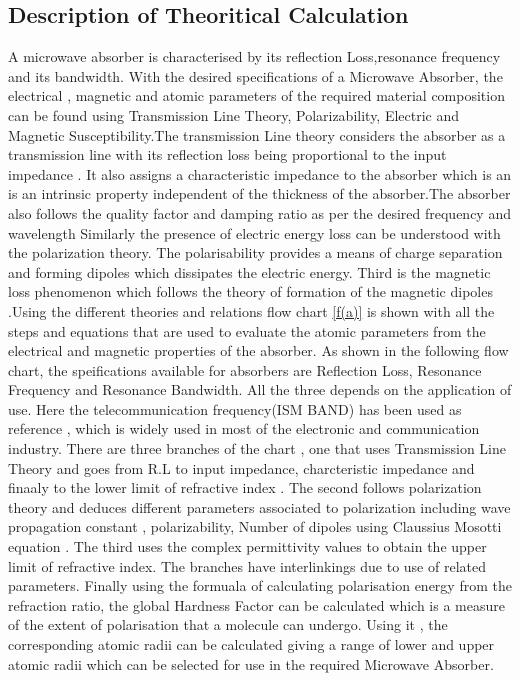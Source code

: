 \documentclass[journal]{IEEEtran}
\begin{document}
\subsection{Description of Theoritical Calculation}
A microwave absorber is characterised by its reflection Loss,resonance frequency and its bandwidth.  With the desired specifications of a Microwave Absorber, the electrical , magnetic and atomic parameters of the required  material composition can be found  using Transmission Line Theory, Polarizability, Electric and Magnetic Susceptibility\cite{YingL,liu2018systemized}.The transmission Line theory considers the absorber as a transmission line with its reflection loss being proportional to the input impedance . It also assigns a characteristic impedance to the absorber which is an  is an intrinsic property independent of the thickness of the absorber.The absorber also follows the quality factor and damping ratio as per the desired frequency and wavelength\cite{Cory,Tooley} Similarly the presence of electric energy loss can be understood with the polarization theory. The polarisability provides a means of charge separation and forming dipoles which dissipates the electric energy\cite{AlphaP,Inter}. Third is the magnetic loss phenomenon which follows the theory of formation of the magnetic dipoles \cite{}  .Using the different theories and relations flow chart \ref{f(a)} is shown with all the steps and equations that are used to evaluate the atomic parameters from the electrical and magnetic properties of the absorber. As shown in the following flow chart, the speifications available for absorbers are Reflection Loss, Resonance Frequency and Resonance Bandwidth. All the three depends on the application of use. Here the telecommunication frequency(ISM BAND) has been used as reference , which is widely used in most of the electronic and communication industry. There are three branches of the chart , one that uses Transmission Line Theory and goes from R.L to input impedance, charcteristic impedance and finaaly to the lower limit of refractive index \cite{YingL,Shukla} . The second follows polarization theory and deduces different parameters associated to polarization including wave propagation constant , polarizability, Number of dipoles using Claussius Mosotti equation \cite{liu2018systemized,shannon,Erbium,polar}. The third uses the complex permittivity values to obtain the upper limit of refractive index. The branches have interlinkings due to use of related parameters\cite{Ian,booke}. Finally using the formuala of calculating polarisation energy from the refraction ratio, the global Hardness Factor can be calculated which is a  measure of the extent of polarisation that a molecule can undergo\cite{ghosh2002theoretical}. Using it , the corresponding atomic radii can be calculated giving a range of lower and upper atomic radii which can be selected for use in the required Microwave Absorber.
\end{document}
